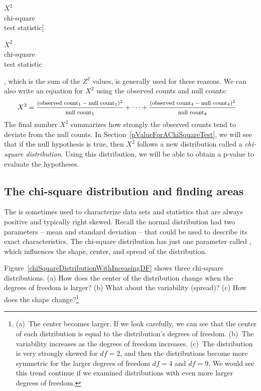 $X^2$\vspace{0.5mm}\\\footnotesize chi-square\\test statistic]{\raggedright\vspace{9mm}

$X^2$\vspace{0.5mm}\\\footnotesize chi-square\\test statistic}, which is the sum of the $Z^2$ values, is generally used for these reasons. We can also write an equation for $X^2$ using the observed counts and null counts:
{\begin{align*}
X^2 &=
	\frac
	{\text{\footnotesize$(\text{observed count}_1 - \text{null count}_1)^2$}}
	{\text{\footnotesize$\text{null count}_1$}}
	+ \dots + \frac
	{\text{\footnotesize$(\text{observed count}_4 - \text{null count}_4)^2$}}
	{\text{\footnotesize$\text{null count}_4$}}
\end{align*}
}The final number $X^2$ summarizes how strongly the observed counts tend to deviate from the null counts. In Section~\ref{pValueForAChiSquareTest}, we will see that if the null hypothesis is true, then $X^2$ follows a new distribution called a \emph{chi-square distribution}. Using this distribution, we will be able to obtain a p-value to evaluate the hypotheses.


\subsection{The chi-square distribution and finding areas}

The  is sometimes used to characterize data sets and statistics that are always positive and typically right skewed. Recall the normal distribution had two parameters -- mean and standard deviation -- that could be used to describe its exact characteristics. The chi-square distribution has just one parameter called , which influences the shape, center, and spread of the distribution.

\begin{exercise}\label{exerChiSquareDistributionDescriptionWithMoreDOF}
Figure~\ref{chiSquareDistributionWithInceasingDF} shows three chi-square distributions. (a) How does the center of the distribution change when the degrees of freedom is larger? (b) What about the variability (spread)? (c) How does the shape change?\footnote{(a)~The center becomes larger. If we look carefully, we can see that the center of each distribution is equal to the distribution's degrees of freedom. (b)~The variability increases as the degrees of freedom increases. (c)~The distribution is very strongly skewed for $df=2$, and then the distributions become more symmetric for the larger degrees of freedom $df=4$ and $df=9$. We would see this trend continue if we examined distributions with even more larger degrees of freedom.}
\end{exercise}

